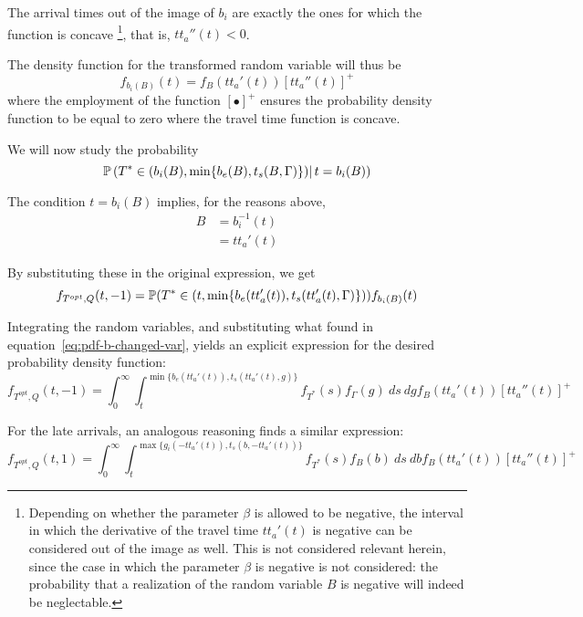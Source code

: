 The arrival times out of the image of \(b_i\) are exactly the ones for which the function is concave
\footnote{
  Depending on whether the parameter \(\beta\) is allowed to be negative,
  the interval in which the derivative of the travel time \(tt_a'(t)\) is negative can be considered out of the image as well.
  This is not considered relevant herein,
  since the case in which the parameter \(\beta\) is negative is not considered:
  the probability that a realization of the random variable \(B\) is negative will indeed be neglectable.
},
that is, \(tt_a''(t) < 0\).

The density function for the transformed random variable will thus be
\begin{equation}
  \label{eq:pdf-b-changed-var}
  f_{b_i(B)}(t) = f_B(tt_a'(t)) [tt_a''(t)]^+
\end{equation}
where the employment of the function \([\bullet]^+\) ensures the probability density function to be equal to zero where the travel time function is concave.

We will now study the probability
\begin{equation*}
  \mathbb{P}\left(T^* \in (b_i(B), \min\{b_e(B), t_s(B, \Gamma)\})|\, t = b_i(B)\right)
\end{equation*}

The condition \(t = b_i(B)\) implies, for the reasons above,
\begin{align*}
  B & = b_i^{-1}(t) \\
    & = tt_a'(t)
\end{align*}

By substituting these in the original expression, we get
\begin{equation}
  \label{eq:early-subst}
  f_{T^{opt}, Q}(t, -1) = \mathbb{P}(T^* \in (t, \min\{b_e(tt_a'(t)), t_s(tt_a'(t), \Gamma)\}))f_{b_i(B)}(t)
\end{equation}

Integrating the random variables,
and substituting what found in equation~\eqref{eq:pdf-b-changed-var},
yields an explicit expression for the desired probability density function:
\begin{equation}
  \label{eq:early-final}
  f_{T^{opt}, Q}(t, -1) = \int_0^\infty \int_t^{\min\{b_e(tt_a'(t)), t_s(tt_a'(t), g)\}}f_{T^*}(s) f_\Gamma(g)\ ds\ dg f_B(tt_a'(t)) [tt_a''(t)]^+
\end{equation}

For the late arrivals, an analogous reasoning finds a similar expression:
\begin{equation}
  \label{eq:late-final}
  f_{T^{opt}, Q}(t, 1) = \int_0^\infty \int_t^{\max\{g_i(-tt_a'(t)), t_s(b, -tt_a'(t))\}}f_{T^*}(s) f_B(b)\ ds\ db f_B(tt_a'(t)) [tt_a''(t)]^+
\end{equation}

